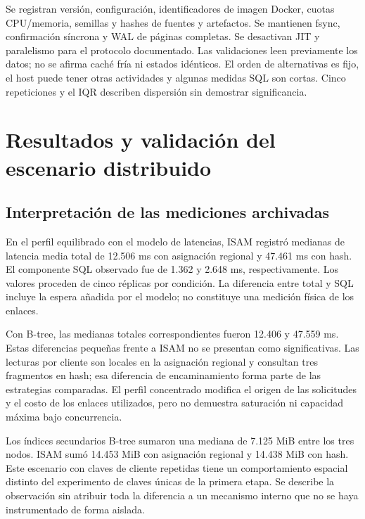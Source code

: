 \documentclass[11pt,a4paper]{article}
\begin{document}
Se registran versión, configuración, identificadores de imagen Docker, cuotas
CPU/memoria, semillas y hashes de fuentes y artefactos. Se mantienen fsync,
confirmación síncrona y WAL de páginas completas. Se desactivan JIT y paralelismo
para el protocolo documentado. Las validaciones leen previamente los datos;
no se afirma caché fría ni estados idénticos. El orden de alternativas es fijo,
el host puede tener otras actividades y algunas medidas SQL son cortas.
Cinco repeticiones y el IQR describen dispersión sin demostrar significancia.

\section{Resultados y validación del escenario distribuido}

\subsection{Interpretación de las mediciones archivadas}
En el perfil equilibrado con el modelo de latencias, ISAM registró medianas de
latencia media total de 12.506 ms con asignación regional y 47.461 ms con hash.
El componente SQL observado fue de 1.362 y 2.648 ms, respectivamente. Los valores
proceden de cinco réplicas por condición. La diferencia entre total y SQL incluye
la espera añadida por el modelo; no constituye una medición física de los enlaces.

Con B-tree, las medianas totales correspondientes fueron 12.406 y 47.559 ms.
Estas diferencias pequeñas frente a ISAM no se presentan como significativas.
Las lecturas por cliente son locales en la asignación regional y consultan tres
fragmentos en hash; esa diferencia de encaminamiento forma parte de las
estrategias comparadas. El perfil concentrado modifica el origen de las
solicitudes y el costo de los enlaces utilizados, pero no demuestra saturación
ni capacidad máxima bajo concurrencia.

Los índices secundarios B-tree sumaron una mediana de 7.125 MiB entre los tres
nodos. ISAM sumó 14.453 MiB con asignación regional y 14.438 MiB con hash.
Este escenario con claves de cliente repetidas tiene un comportamiento espacial
distinto del experimento de claves únicas de la primera etapa. Se describe la
observación sin atribuir toda la diferencia a un mecanismo interno que no se
haya instrumentado de forma aislada.
\end{document}
